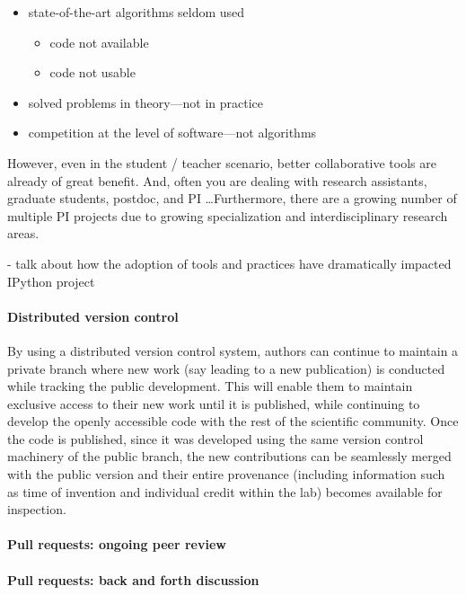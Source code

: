 \documentclass[ChapterTOCs,krantz2]{krantz} %
\begin{document}
\begin{itemize}
\item  state-of-the-art algorithms seldom used

\begin{itemize}
\item code not available
\item code not usable
\end{itemize}

\item solved problems in theory---not in practice
\item competition at the level of software---not algorithms
\end{itemize}

However, even in the student / teacher scenario, better collaborative tools
are already of great benefit.  And, often you are dealing with research
assistants, graduate students, postdoc, and PI \ldots  Furthermore, there are a
growing number of multiple PI projects due to growing specialization and
interdisciplinary research areas.

- talk about how the adoption of tools and practices have dramatically
impacted IPython project

\paragraph{ {\bf Distributed version control}}

By using a distributed version control system, authors can continue
to maintain a private branch where new work (say leading to a new
publication) is conducted while tracking the public development. This
will enable them to maintain exclusive access to their new work until
it is published, while continuing to develop the openly accessible
code with the rest of the scientific community. Once the code is published,
since it was developed using the same version control machinery of
the public branch, the new contributions can be seamlessly merged
with the public version and their entire provenance (including information
such as time of invention and individual credit within the lab) becomes
available for inspection.

\paragraph{ {\bf Pull requests: ongoing peer review}}

\paragraph{ {\bf Pull requests: back and forth discussion}}
\end{document}
